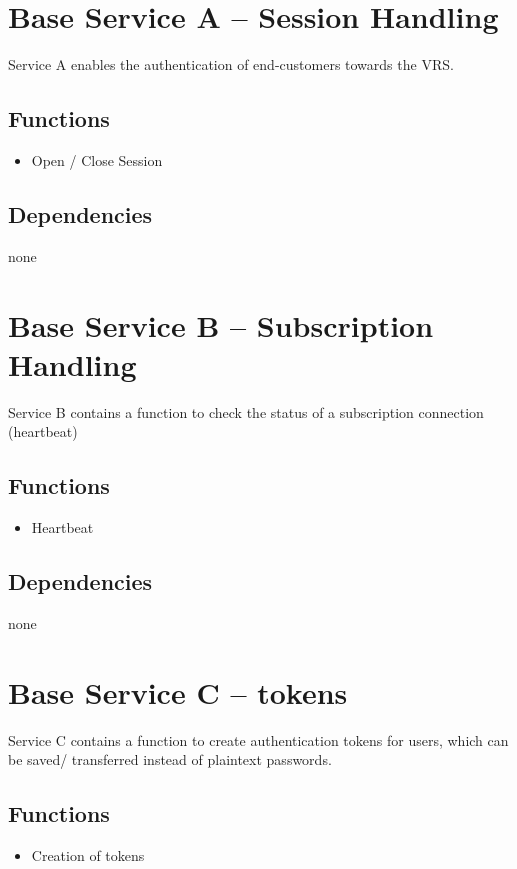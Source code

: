 \section{Base Service A -- Session Handling}
\label{sec:Hierachiemodell:BasisdienstA}
Service A enables the authentication of end-customers towards the VRS.

\subsection*{Functions}
\begin{itemize}
\item Open / Close Session
\end{itemize}

\subsection*{Dependencies}
none

\section{Base Service B -- Subscription Handling}
\label{sec:Hierachiemodell:BasisdienstB}
Service B contains a function to check the status of a subscription connection (heartbeat)

\subsection*{Functions}
\begin{itemize}
\item Heartbeat
\end{itemize}

\subsection*{Dependencies}
none

\section{Base Service C -- tokens}
\label{sec:Hierachiemodell:BasisdienstC}
Service C contains a function to create authentication tokens for users, which can be saved/ transferred instead of plaintext passwords.

\subsection*{Functions}
\begin{itemize}
\item Creation of tokens
\end{itemize}

